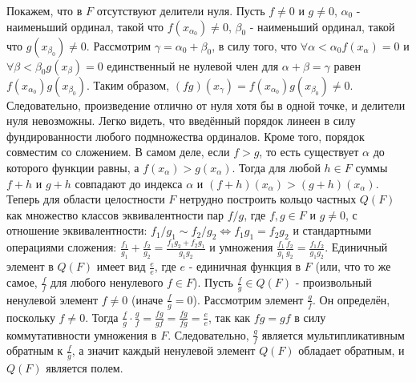 \documentclass[12pt]{article}
\begin{document}
Покажем, что в $F$ отсутствуют делители нуля. Пусть $f \neq 0$ и $g \neq 0$, $\alpha_0$ - наименьший ординал, такой что $f(x_{\alpha_0}) \neq 0$, $\beta_0$ - наименьший ординал, такой что $g(x_{\beta_0}) \neq 0$. Рассмотрим $\gamma = \alpha_0 + \beta_0$, в силу того, что $\forall \alpha < \alpha_0 f(x_{\alpha}) = 0$ и $\forall \beta < \beta_0 g(x_{\beta}) = 0$ единственный не нулевой член для $\alpha + \beta = \gamma$ равен $f(x_{\alpha_0})g(x_{\beta_0})$. Таким образом, $(fg)(x_{\gamma}) = f(x_{\alpha_0})g(x_{\beta_0}) \neq 0$. Следовательно, произведение отлично от нуля хотя бы в одной точке, и делители нуля невозможны. Легко видеть, что введённый порядок линеен в силу фундированности любого подмножества ординалов. Кроме того, порядок совместим со сложением. В самом деле, если $f > g$, то есть существует $\alpha$ до которого функции равны, а $f(x_{\alpha}) > g(x_{\alpha})$. Тогда для любой $h \in F$ суммы $f + h$ и $g + h$ совпадают до индекса $\alpha$ и $(f + h)(x_{\alpha}) > (g + h)(x_{\alpha})$. Теперь для области целостности $F$ нетрудно построить кольцо частных $Q(F)$ как множество классов эквивалентности пар $f/g$, где $f, g \in F$ и $g \neq 0$, с отношение эквивалентности: $f_1/g_1 \sim f_2/g_2 \Leftrightarrow f_1g_1=f_2g_2$ и стандартными операциями сложения: $\frac{f_1}{g_1} + \frac{f_2}{g_2} = \frac{f_1g_2 + f_2g_1}{g_1g_2}$ и умножения $\frac{f_1}{g_1}\frac{f_2}{g_2}=\frac{f_1f_2}{g_1g_2}$. Единичный элемент в $Q(F)$ имеет вид $\frac{e}{e}$, где $e$ - единичная функция в $F$ (или, что то же самое, $\frac{f}{f}$ для любого ненулевого $f \in F$). Пусть $\frac{f}{g} \in Q(F)$ - произвольный ненулевой элемент $f \neq 0$ (иначе $\frac{f}{g} = 0$). Рассмотрим элемент $\frac{g}{f}$. Он определён, поскольку $f \neq 0$. Тогда $\frac{f}{g} \cdot \frac{g}{f} = \frac{fg}{gf} = \frac{fg}{fg} = \frac{e}{e}$, так как $fg = gf$ в силу коммутативности умножения в $F$. Следовательно, $\frac{g}{f}$ является мультипликативным обратным к $\frac{f}{g}$, а значит  каждый ненулевой элемент $Q(F)$ обладает обратным, и $Q(F)$ является полем. 
\end{document}
